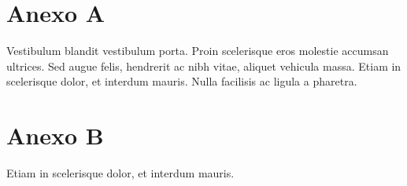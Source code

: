 \documentclass[book,A4paper,10pt,twoside,oldfontcommands]{memoir}\usepackage[]{graphicx}\usepackage[usenames,dvipsnames]{color}
\begin{document}

\section*{Anexo A}

Vestibulum blandit vestibulum porta. Proin scelerisque eros molestie
accumsan ultrices. Sed augue felis, hendrerit ac nibh vitae, aliquet
vehicula massa. Etiam in scelerisque dolor, et interdum mauris. Nulla
facilisis ac ligula a pharetra.

\section*{Anexo B}

Etiam in scelerisque dolor, et interdum mauris.
\end{document}
